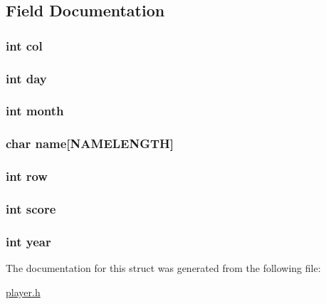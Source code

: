\subsection{Field Documentation}
\hypertarget{structplayer_afb52e720f5f0c483db5861f9e42e924e}{
\subsubsection[{col}]{\setlength{\rightskip}{0pt plus 5cm}int col}}\label{structplayer_afb52e720f5f0c483db5861f9e42e924e}
\hypertarget{structplayer_a4c11afc03fc3ee49bab660def6558f2a}{
\subsubsection[{day}]{\setlength{\rightskip}{0pt plus 5cm}int day}}\label{structplayer_a4c11afc03fc3ee49bab660def6558f2a}
\hypertarget{structplayer_aedb06abe5aff12fa3e7e0e71a374edfb}{
\subsubsection[{month}]{\setlength{\rightskip}{0pt plus 5cm}int month}}\label{structplayer_aedb06abe5aff12fa3e7e0e71a374edfb}
\hypertarget{structplayer_ade40c7dcb824cf7ccf1d12f56df289e7}{
\subsubsection[{name}]{\setlength{\rightskip}{0pt plus 5cm}char name\mbox{[}{\bf N\-A\-M\-E\-L\-E\-N\-G\-T\-H}\mbox{]}}}\label{structplayer_ade40c7dcb824cf7ccf1d12f56df289e7}
\hypertarget{structplayer_af1d3cff2e4538e23400e260bae3dadad}{
\subsubsection[{row}]{\setlength{\rightskip}{0pt plus 5cm}int row}}\label{structplayer_af1d3cff2e4538e23400e260bae3dadad}
\hypertarget{structplayer_aef160b7437d94056f1dc59646cd5b87d}{
\subsubsection[{score}]{\setlength{\rightskip}{0pt plus 5cm}int score}}\label{structplayer_aef160b7437d94056f1dc59646cd5b87d}
\hypertarget{structplayer_abeac221e38b7b9ce7df8722c842bf671}{
\subsubsection[{year}]{\setlength{\rightskip}{0pt plus 5cm}int year}}\label{structplayer_abeac221e38b7b9ce7df8722c842bf671}


The documentation for this struct was generated from the following file\-:\begin{DoxyCompactItemize}
\item 
\hyperlink{player_8h}{player.\-h}\end{DoxyCompactItemize}
